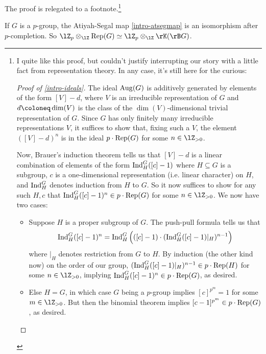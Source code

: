 The proof is relegated to a footnote.\footnote{ I quite like this
  proof, but couldn't justify interrupting our story with a little
  fact from representation theory. In any case, it's still here for
  the curious:

  \begin{proof}[Proof of \cref{intro-ideals}]
    The ideal $\operatorname{Aug}(G)$ is additively generated by elements of the
    form $[V] - d$, where $V$ is an irreducible representation of $G$
    and $d \ce \dim(V)$ is the class of the $\dim(V)$-dimensional
    trivial representation of $G$. Since $G$ has only finitely many
    irreducible representations $V$, it suffices to show that, fixing
    such a $V$, the element $([V] - d)^n$ is in the ideal
    $p \cdot \operatorname{Rep}(G)$ for some $n \in \lZ_{> 0}$.

    Now, Brauer's induction theorem tells us that $[V]-d$ is a linear
    combination of elements of the form $\operatorname{Ind}_H^G([c]-1)$ where
    $H \subseteq G$ is a subgroup, $c$ is a one-dimensional
    representation (i.e. linear character) on $H$, and $\operatorname{Ind}_H^G$
    denotes induction from $H$ to $G$. So it now suffices to show for
    any such $H,c$ that $\operatorname{Ind}_H^G([c]-1)^n \in p \cdot \operatorname{Rep}(G)$ for
    some $n \in \lZ_{> 0}$. We now have two cases:
    \begin{itemize}
    \item Suppose $H$ is a proper subgroup of $G$. The push-pull
      formula tells us that
      \[
      \operatorname{Ind}_H^G([c]-1)^n = \operatorname{Ind}_H^G\left(([c]-1) \cdot
      (\operatorname{Ind}_H^G([c]-1)|_H)^{n-1}\right)
      \]
      where $|_H$ denotes restriction from $G$ to $H$. By induction
      (the other kind now) on the order of our group,
      $(\operatorname{Ind}_H^G([c]-1)|_H)^{n-1} \in p \cdot \operatorname{Rep}(H)$ for some
      $n \in \lZ_{> 0}$, implying
      $\operatorname{Ind}_H^G([c]-1)^n \in p \cdot \operatorname{Rep}(G)$, as desired.
    \item Else $H = G$, in which case $G$ being a $p$-group implies
      $[c]^{p^m} = 1$ for some $m \in \lZ_{> 0}$. But then the
      binomial theorem implies $[c-1]^{p^m} \in p \cdot \operatorname{Rep}(G)$, as
      desired. \qedhere
    \end{itemize}
  \end{proof}
}

\begin{lemma}
  \label{intro-completions}
  If $G$ is a $p$-group, the Atiyah-Segal map \cref{intro-atsegmap} is
  an isomorphism after $p$-completion. So
  $\lZ_p \otimes_\lZ \Rep(G) \iso \lZ_p \otimes_\lZ \rK(\rB G)$.
\end{lemma}


